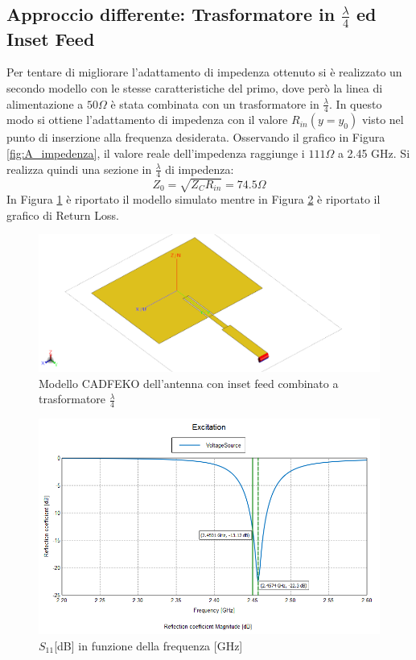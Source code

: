 \documentclass[twoside,twocolumn]{article}
\begin{document}
\subsection*{Approccio differente: Trasformatore in $\frac{\lambda}{4}$ ed Inset Feed }
Per tentare di migliorare l'adattamento di impedenza ottenuto si è realizzato un secondo modello con le stesse caratteristiche del primo, dove però la linea di alimentazione a $50\Omega$ è stata combinata con un trasformatore in $\frac{\lambda}{4}$.
In questo modo si ottiene l'adattamento di impedenza con il valore $R_{in}(y=y_{0})$ visto nel punto di inserzione alla frequenza desiderata. \newline Osservando il grafico in Figura \ref{fig:A_impedenza}, il valore reale dell'impedenza raggiunge i $111 \Omega$ a 2.45 GHz. Si realizza quindi una sezione  in $\frac{\lambda}{4}$ di impedenza:
\begin{equation}
Z_{0}=\sqrt{Z_{C}R_{in}}=74.5 \Omega
\end{equation}
In Figura \ref{fig:A1_Cad} è riportato il modello simulato mentre in Figura \ref{fig:A1_S11} è riportato il grafico di Return Loss.
 \begin{figure}[h!]
  \includegraphics[width=\linewidth]{A1_Cad.png}
  \caption{Modello CADFEKO dell'antenna con inset feed combinato a trasformatore $\frac{\lambda}{4}$}
  \label{fig:A1_Cad}
\end{figure}
\begin{figure}[h!]
  \includegraphics[width=\linewidth]{A1_S11.png}
  \caption{$S_{11} $[dB] in funzione della frequenza [GHz] }
  \label{fig:A1_S11}
\end{figure}
\end{document}
